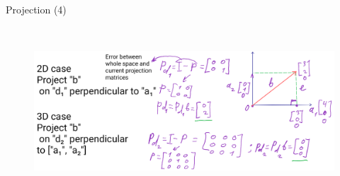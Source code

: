 \documentclass[aspectratio=169,notes]{beamer}
\begin{document}
\begin{frame}[t]{Projection (4)}
    \framesubtitle{}
    \begin{figure}[H]
        \centering\includegraphics[height=6cm,width=1\textwidth,keepaspectratio]{AGLA2_for_slides_4.png}
        \label{fig:AGLA2_for_slides_4.png}
    \end{figure}
\end{frame}
\end{document}
